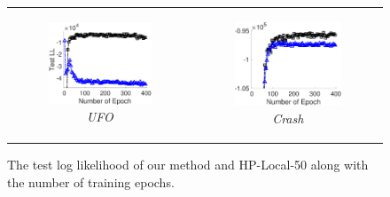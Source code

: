 \begin{figure}
	\centering
	\setlength\tabcolsep{0.01pt}
	\begin{tabular}[c]{cc}
		\begin{subfigure}[t]{0.48\linewidth}
			\centering
			\includegraphics[width=\linewidth]{./figs/ufo_ll_epoch.eps}
			\caption{\textit{UFO}}
		\end{subfigure} 
		&
		\begin{subfigure}[t]{0.48\linewidth}
			\centering
			\includegraphics[width=\linewidth]{./figs/crash_ll_epoch.eps}
			\caption{\textit{Crash}}
		\end{subfigure}
	\end{tabular}
\vspace{-0.1in}
\caption{\small The test log likelihood of our method and HP-Local-50 along with the number of training epochs.} 	
\label{fig:learn-curve}
\vspace{-0.3in}
\end{figure}
